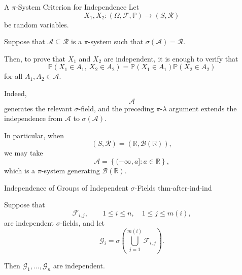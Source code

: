 
\begin{observation}{A $\pi$-System Criterion for Independence}
Let
\[
X_1,X_2:(\Omega,\mathcal{F},\mathbb{P})
\longrightarrow
(S,\mathcal{R})
\]
be random variables.

Suppose that $\mathcal{A}\subseteq\mathcal{R}$ is a $\pi$-system
such that
\(
\sigma(\mathcal{A})=\mathcal{R}.
\)

Then, to prove that $X_1$ and $X_2$ are independent, it is enough
to verify that
\[
\mathbb{P}(X_1\in A_1,\ X_2\in A_2)
=
\mathbb{P}(X_1\in A_1)
\mathbb{P}(X_2\in A_2)
\]
for all
\(
A_1,A_2\in\mathcal{A}.
\)

Indeed,
\[
\mathcal{A}
\]
generates the relevant $\sigma$-field, and the preceding
$\pi$-$\lambda$ argument extends the independence from
$\mathcal{A}$ to $\sigma(\mathcal{A})$.

In particular, when
\[
(S,\mathcal{R})
=
(\mathbb{R},\mathcal{B}(\mathbb{R})),
\]
we may take
\[
\mathcal{A}
=
\left\{
(-\infty,a]:
a\in\mathbb{R}
\right\},
\]
which is a $\pi$-system generating
$\mathcal{B}(\mathbb{R})$.

\end{observation}



\begin{theorem}{Independence of Groups of Independent $\sigma$-Fields}
{thm-after-ind-ind}

Suppose that
\[
\mathcal{F}_{i,j},
\qquad
1\leq i\leq n,
\quad
1\leq j\leq m(i),
\]
are independent $\sigma$-fields, and let
\[
\mathcal{G}_i
=
\sigma\left(
\bigcup_{j=1}^{m(i)}
\mathcal{F}_{i,j}
\right).
\]

Then
\(
\mathcal{G}_1,\ldots,\mathcal{G}_n
\)
are independent.

\end{theorem}

